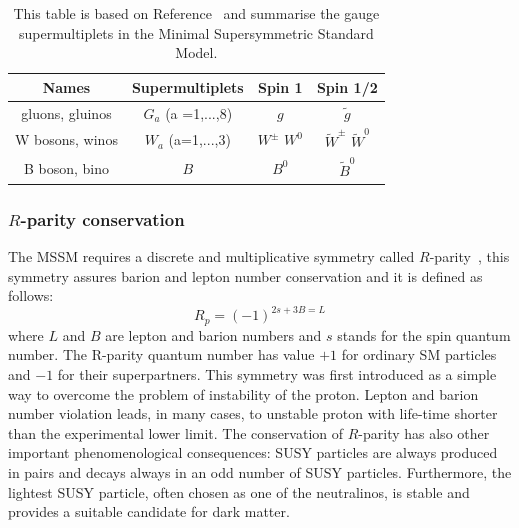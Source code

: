 \begin{table}
\begin{center}
\renewcommand{\arraystretch}{1.5}
\begin{tabular}{c|ccc}
Names			&Supermultiplets& Spin 1 		&	Spin 1/2 \\
\hline
gluons, gluinos		&$G_a$ (a =1,...,8)	& $g$			& $\tilde{g}$	\\
W bosons, winos		& $W_a$ (a=1,...,3)	& $W^{\pm}$ $W^0$	& $\tilde{W}^{\pm}$ $\tilde{W}^0$ \\
B boson, bino		&$B$			& $B^0$			& $\tilde{B}^0$ \\
\hline
\end{tabular}
\caption{This table is based on Reference~\cite{SusyPrimer} and summarise the gauge supermultiplets in the Minimal Supersymmetric Standard Model.}
\label{tab:gaugesup}
\end{center}
\end{table}

\subsubsection{$R$-parity conservation}
The MSSM requires a discrete and multiplicative symmetry called $R$-parity~\cite{Susy3}, this symmetry assures barion and lepton number 
conservation and it is defined as follows:
\begin{equation}
R_p = (-1)^{2s+3B=L}
\end{equation}
where $L$ and $B$ are lepton and barion numbers and $s$ stands for the spin quantum number. The R-parity quantum number has value $+1$ for ordinary
SM particles and $-1$ for their superpartners. This symmetry was first introduced as a simple way to overcome the problem of instability of the proton.
Lepton and barion number violation leads, in many cases, 
to unstable proton with life-time shorter than the experimental lower limit. The conservation of $R$-parity has also other important 
phenomenological consequences: SUSY particles are always produced in pairs and decays always in an odd number of SUSY particles.
Furthermore, the lightest SUSY particle, often chosen as one of the neutralinos, is stable and provides a suitable 
candidate for dark matter.


